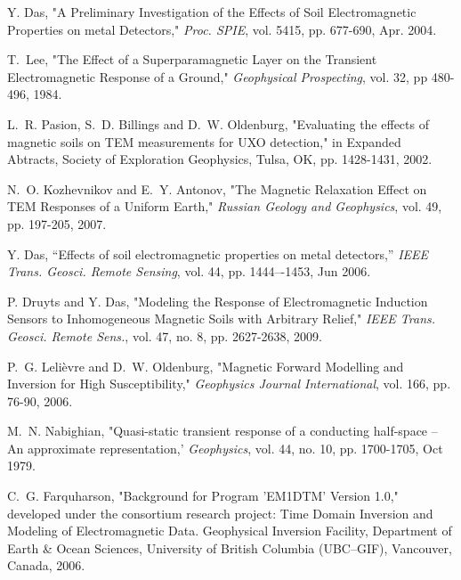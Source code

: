 \documentclass[journal]{IEEEtran}  %
\begin{document}
\begin{thebibliography}{100}
Y. Das, "A Preliminary Investigation of the Effects of Soil Electromagnetic Properties on metal Detectors," \emph{Proc. SPIE}, vol. 5415, pp. 677-690, Apr. 2004.

T.~Lee, "The Effect of a Superparamagnetic Layer on the Transient Electromagnetic Response of a Ground," \emph{Geophysical Prospecting}, vol. 32, pp 480-496, 1984.

L.~R. Pasion, S.~D. Billings and D.~W. Oldenburg, "Evaluating the effects of magnetic soils on TEM measurements for UXO detection," in {Expanded Abtracts}, Society of Exploration Geophysics, Tulsa, OK, pp. 1428-1431, 2002.

N.~O. Kozhevnikov and E.~Y. Antonov, "The Magnetic Relaxation Effect on TEM Responses of a Uniform Earth," \emph{Russian Geology and Geophysics}, vol. 49, pp. 197-205, 2007.

Y. Das, “Effects of soil electromagnetic properties on metal detectors,” \emph{IEEE Trans. Geosci. Remote Sensing}, vol. 44, pp. 1444–-1453, Jun 2006.

P. Druyts and Y. Das, "Modeling the Response of Electromagnetic Induction Sensors to Inhomogeneous Magnetic Soils with Arbitrary Relief," \emph{IEEE Trans. Geosci. Remote Sens.}, vol. 47, no. 8, pp. 2627-2638, 2009.

P.~G. Leli\`{e}vre and D.~W. Oldenburg, "Magnetic Forward Modelling and Inversion for High Susceptibility," \emph{Geophysics Journal International}, vol. 166, pp. 76-90, 2006.

M.~N. Nabighian, "Quasi-static transient response of a conducting half-space -- An approximate representation,' \emph{Geophysics}, vol. 44, no. 10, pp. 1700-1705, Oct 1979.

C.~G. Farquharson, "Background for Program 'EM1DTM' Version 1.0," developed under the consortium research project: Time Domain Inversion and Modeling of Electromagnetic Data. Geophysical Inversion Facility, Department of Earth \& Ocean Sciences, University of British Columbia (UBC–GIF), Vancouver, Canada, 2006. 



\end{thebibliography}
\end{document}
